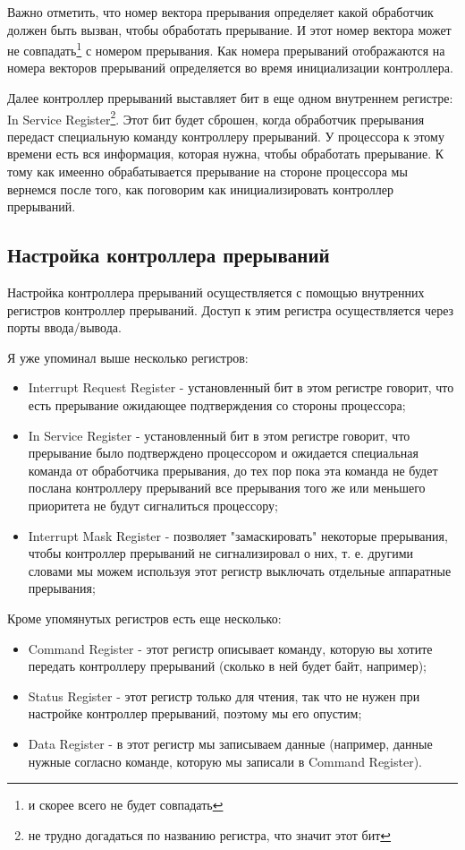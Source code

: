 Важно отметить, что номер вектора прерывания определяет какой обработчик должен
быть вызван, чтобы обработать прерывание. И этот номер вектора может не
совпадать\footnote{и скорее всего не будет совпадать} с номером прерывания. Как
номера прерываний отображаются на номера векторов прерываний определяется во
время инициализации контроллера.

Далее контроллер прерываний выставляет бит в еще одном внутреннем регистре: In
Service Register\footnote{не трудно догадаться по названию регистра, что значит
этот бит}. Этот бит будет сброшен, когда обработчик прерывания передаст
специальную команду контроллеру прерываний. У процессора к этому времени есть
вся информация, которая нужна, чтобы обработать прерывание. К тому как имеенно
обрабатывается прерывание на стороне процессора мы вернемся после того, как
поговорим как инициализировать контроллер прерываний.

\subsection{Настройка контроллера прерываний}

Настройка контроллера прерываний осуществляется с помощью внутренних регистров
контроллер прерываний. Доступ к этим регистра осуществляется через порты
ввода/вывода.

Я уже упоминал выше несколько регистров:
\begin{itemize}
  \item Interrupt Request Register - установленный бит в этом регистре говорит,
        что есть прерывание ожидающее подтверждения со стороны процессора;
  \item In Service Register - установленный бит в этом регистре говорит, что
        прерывание было подтверждено процессором и ожидается специальная
        команда от обработчика прерывания, до тех пор пока эта команда не будет
        послана контроллеру прерываний все прерывания того же или меньшего
        приоритета не будут сигналиться процессору;
  \item Interrupt Mask Register - позволяет "замаскировать" некоторые
        прерывания, чтобы контроллер прерываний не сигнализировал о них, т. е.
        другими словами мы можем используя этот регистр выключать отдельные
        аппаратные прерывания;
\end{itemize}

Кроме упомянутых регистров есть еще несколько:
\begin{itemize}
  \item Command Register - этот регистр описывает команду, которую вы хотите
        передать контроллеру прерываний (сколько в ней будет байт, например);
  \item Status Register - этот регистр только для чтения, так что не нужен при
        настройке контроллер прерываний, поэтому мы его опустим;
  \item Data Register - в этот регистр мы записываем данные (например, данные
        нужные согласно команде, которую мы записали в Command Register).
\end{itemize}

